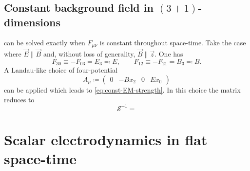 \documentclass[12pt]{article}
\newcommand\mi{\mathrm{i}} %
\newcommand\me{\mathrm{e}} %
\newcommand\dif{\mathrm{d}}
\DeclareMathOperator{\Tr}{Tr}
\newcommand{\rbr}[1]{{\left(#1\right)}}
\newcommand{\rfun}[2]{{#1}\mathopen{}\left(#2\right)\mathclose{}}
\newcommand{\sfun}[2]{{#1}\mathopen{}\left[#2\right]\mathclose{}}
\begin{document}
\subsection{Constant background field in $\rbr{3+1}$-dimensions}

 can be solved exactly when $F_{\mu\nu}$ is constant throughout 
space-time. Take the case \citep{resetsky2012} where $\vec{E}\parallel\vec{B}$ 
and, without loss of generality, $\vec{B}\parallel\vec{z}$. One has
\begin{equation}
F_{30} \equiv -F_{03} = E_3 \eqqcolon E,\qquad
F_{12} \equiv -F_{21} = B_3 \eqqcolon B.
\label{eq:const-EM-strength}
\end{equation}
A Landau-like choice of four-potential \citep{landau1930}
\begin{equation}
A_{\mu} \coloneqq \begin{pmatrix} 0 & -Bx_2 & 0 & Ex_0 \end{pmatrix}
\end{equation}
can be applied which leads to \cref{eq:const-EM-strength}. In this choice the
matrix reduces to
\begin{equation}
\mathcal{S}^{-1} = 
\end{equation}

\cite{heisenberg1936}



\section{Scalar electrodynamics in flat space-time}
\end{document}
